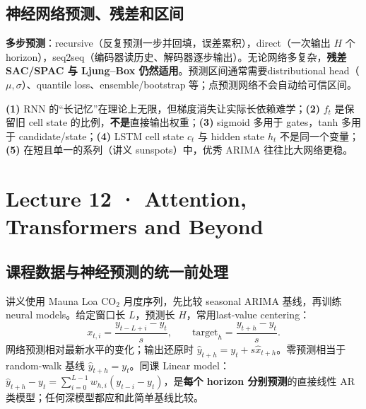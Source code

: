 \documentclass[UTF8,fontset=fandol,10.5pt,a4paper]{ctexart}
\newcommand{\eng}[1]{{\sffamily\color{navy}#1}}
\newcommand{\formula}[1]{\[\boxed{#1}\]}
\begin{document}
\subsection{神经网络预测、残差和区间}
\textbf{多步预测}：\eng{recursive}（反复预测一步并回填，误差累积），\eng{direct}（一次输出 $H$ 个 horizon），\eng{seq2seq}（编码器读历史、解码器逐步输出）。无论网络多复杂，\textbf{残差 SAC/SPAC 与 Ljung--Box 仍然适用}。预测区间通常需要\eng{distributional head}（$\mu,\sigma$）、quantile loss、ensemble/bootstrap 等；点预测网络不会自动给可信区间。
\begin{pitbox}
\textbf{(1)} RNN 的“长记忆”在理论上无限，但梯度消失让实际长依赖难学；\textbf{(2)} $f_t$ 是保留旧 cell state 的比例，\textbf{不是}直接输出权重；\textbf{(3)} sigmoid 多用于 gates，tanh 多用于 candidate/state；\textbf{(4)} LSTM cell state $c_t$ 与 hidden state $h_t$ 不是同一个变量；\textbf{(5)} 在短且单一的系列（讲义 sunspots）中，优秀 ARIMA 往往比大网络更稳。
\end{pitbox}
\clearpage
\section{Lecture 12 · Attention, Transformers and Beyond}
\subsection{课程数据与神经预测的统一前处理}
讲义使用 \eng{Mauna Loa CO$_2$} 月度序列，先比较 seasonal ARIMA 基线，再训练 neural models。给定窗口长 $L$，预测长 $H$，常用\eng{last-value centering}：
\formula{x_{t,i}=\frac{y_{t-L+i}-y_t}{s},\qquad\mathrm{target}_h=\frac{y_{t+h}-y_t}{s}.}
网络预测相对最新水平的变化；输出还原时 $\hat y_{t+h}=y_t+s\hat x_{t+h}$。零预测相当于 random-walk 基线 $\hat y_{t+h}=y_t$。同课 \eng{Linear model}：$\hat y_{t+h}-y_t=\sum_{i=0}^{L-1}w_{h,i}(y_{t-i}-y_t)$，是\textbf{每个 horizon 分别预测}的直接线性 AR 类模型；任何深模型都应和此简单基线比较。
\end{document}
